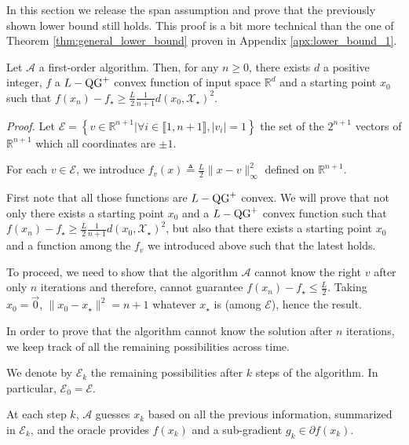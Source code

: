 In this section we release the span assumption and prove that the previously shown lower bound still holds. This proof is a bit more technical than the one of Theorem \ref{thm:general_lower_bound} proven in Appendix \ref{apx:lower_bound_1}.

\begin{Th}
    Let $\mathcal{A}$ a first-order algorithm.
    Then, for any $n \geq 0$, there exists $d$ a positive integer, $f$ a $L-\operatorname{QG}^+$ convex function of input space $\mathbb{R}^d$ and a starting point $x_0$ such that $f(x_n) - f_\star \geq \frac{L}{2}\frac{1}{n+1} d(x_0, \mathcal{X}_\star)^2$.
\end{Th}

\noindent \textit{Proof.}
    Let $\mathcal{E} = \left\{ v \in \mathbb{R}^{n+1} | \forall i \in \llbracket 1, n+1 \rrbracket, |v_i| = 1 \right\}$ the set of the $2^{n+1}$ vectors of $\mathbb{R}^{n+1}$ which all coordinates are $\pm 1$.
    
    For each $v\in\mathcal{E}$, we introduce $f_v(x) \triangleq \frac{L}{2}\|x - v\|_\infty^2$ defined on $\mathbb{R}^{n+1}$.
    
    First note that all those functions are $L-\operatorname{QG}^+$ convex.
    We will prove that not only there exists a starting point $x_0$ and a $L-\operatorname{QG}^+$ convex function such that $f(x_n) - f_\star \geq \frac{L}{2}\frac{1}{n+1} d(x_0, \mathcal{X}_\star)^2$, but also that there exists a starting point $x_0$ and a function among the $f_v$ we introduced above such that the latest holds.
    
    To proceed, we need to show that the algorithm $\mathcal{A}$ cannot know the right $v$ after only $n$ iterations and therefore, cannot guarantee $f(x_n) - f_\star \leq \frac{L}{2}$. Taking $x_0 = \Vec{0}$, $\|x_0 - x_\star \|^2 = n+1$ whatever $x_\star$ is (among $\mathcal{E}$), hence the result.
    
    In order to prove that the algorithm cannot know the solution after $n$ iterations, we keep track of all the remaining possibilities across time.
    
    We denote by $\mathcal{E}_k$ the remaining possibilities after $k$ steps of the algorithm.
    In particular, $\mathcal{E}_0=\mathcal{E}$.
    
    At each step $k$, $\mathcal{A}$ guesses $x_k$ based on all the previous information, summarized in $\mathcal{E}_k$, and the oracle provides $f(x_k)$ and a sub-gradient $g_k \in \partial f(x_k)$.
    
